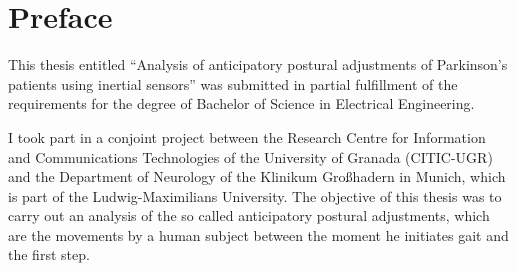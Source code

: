 \chapter*{Preface}

This thesis entitled ``Analysis of anticipatory postural adjustments of Parkinson's patients using inertial sensors'' was submitted in partial fulfillment of the requirements for the degree of Bachelor of Science in Electrical Engineering. 

I took part in a conjoint project between the Research Centre for Information and Communications Technologies of the University of Granada (CITIC-UGR) and the Department of Neurology of the Klinikum Großhadern in Munich, which is part of the Ludwig-Maximilians University. The objective of this thesis was to carry out an analysis of the so called anticipatory postural adjustments, which are the movements by a human subject between the moment he initiates gait and the first step.